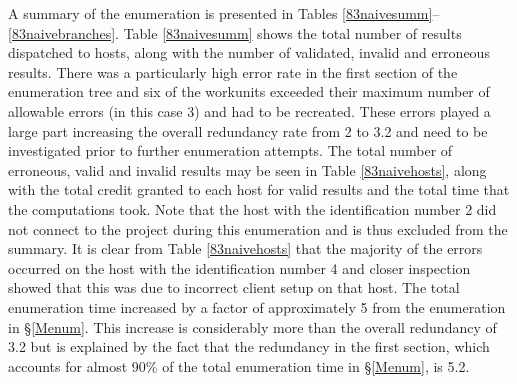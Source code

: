 A summary of the enumeration is presented in Tables  \ref{83naivesumm}--\ref{83naivebranches}. Table \ref{83naivesumm} shows the total number of results dispatched to hosts, along with the number of validated, invalid and erroneous results. There was a particularly high error rate in the first section of the enumeration tree and six of the workunits exceeded their maximum number of allowable errors (in this case 3) and had to be recreated. These errors played a large part increasing the overall redundancy rate from 2 to 3.2 and need to be investigated prior to further enumeration attempts. The total number of erroneous, valid and invalid results may be seen in Table \ref{83naivehosts}, along with the total credit granted to each host for valid results and the total time that the computations took. Note that the host with the identification number 2 did not connect to the project during this enumeration and is thus excluded from the summary.   It is clear from Table \ref{83naivehosts} that the majority of the errors occurred on the host with the identification number 4 and closer inspection showed that this was due to incorrect client setup on that host. The total enumeration time increased by a factor of approximately 5 from the enumeration in \S\ref{Menum}. This increase is considerably more than the overall redundancy of 3.2 but is   explained by the fact that the redundancy in the first section, which accounts for almost 90\% of the total enumeration time in \S\ref{Menum}, is 5.2.

